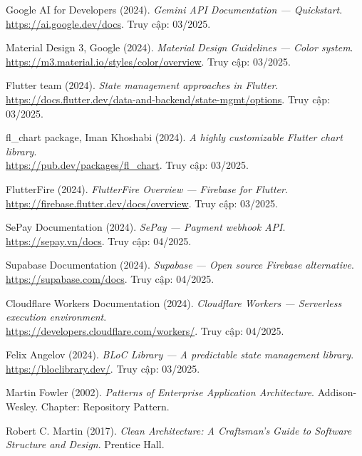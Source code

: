 \begin{enumerate}[label={[\arabic*]}]
  \item Google AI for Developers (2024). \textit{Gemini API Documentation --- Quickstart}.\\
  \url{https://ai.google.dev/docs}. Truy cập: 03/2025.

  \item Material Design 3, Google (2024). \textit{Material Design Guidelines --- Color system}.\\
  \url{https://m3.material.io/styles/color/overview}. Truy cập: 03/2025.

  \item Flutter team (2024). \textit{State management approaches in Flutter}.\\
  \url{https://docs.flutter.dev/data-and-backend/state-mgmt/options}. Truy cập: 03/2025.

  \item fl\_chart package, Iman Khoshabi (2024). \textit{A highly customizable Flutter chart library}.\\
  \url{https://pub.dev/packages/fl_chart}. Truy cập: 03/2025.

  \item FlutterFire (2024). \textit{FlutterFire Overview --- Firebase for Flutter}.\\
  \url{https://firebase.flutter.dev/docs/overview}. Truy cập: 03/2025.

  \item SePay Documentation (2024). \textit{SePay --- Payment webhook API}.\\
  \url{https://sepay.vn/docs}. Truy cập: 04/2025.

  \item Supabase Documentation (2024). \textit{Supabase --- Open source Firebase alternative}.\\
  \url{https://supabase.com/docs}. Truy cập: 04/2025.

  \item Cloudflare Workers Documentation (2024). \textit{Cloudflare Workers --- Serverless execution environment}.\\
  \url{https://developers.cloudflare.com/workers/}. Truy cập: 04/2025.

  \item Felix Angelov (2024). \textit{BLoC Library --- A predictable state management library}.\\
  \url{https://bloclibrary.dev/}. Truy cập: 03/2025.

  \item Martin Fowler (2002). \textit{Patterns of Enterprise Application Architecture}. Addison-Wesley. Chapter: Repository Pattern.

  \item Robert C. Martin (2017). \textit{Clean Architecture: A Craftsman's Guide to Software Structure and Design}. Prentice Hall.

\end{enumerate}
